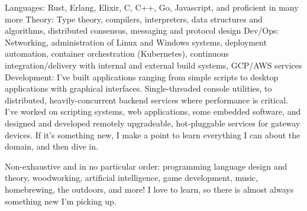 \documentclass[10pt,a4paper]{article}
\begin{document}
\inlineheadsection  %
  {Languages:}
  {Rust, Erlang, Elixir, C, C++, Go, Javascript, and proficient in many more}
\inlineheadsection
  {Theory:}
  {Type theory, compilers, interpreters, data structures and algorithms, distributed consensus, messaging and protocol design}
\inlineheadsection
  {Dev/Ops:}
  {Networking, administration of Linux and Windows systems, deployment automation, container orchestration (Kubernetes), continuous integration/delivery with internal and external build systems, GCP/AWS services}
\inlineheadsection
  {Development:}
  {I've built applications ranging from simple scripts to desktop applications with graphical interfaces. Single-threaded console utilities, to distributed, heavily-concurrent backend services where performance is critical. I've worked on scripting systems, web applications, some embedded software, and designed and developed remotely upgradeable, hot-pluggable services for gateway devices. If it's something new, I make a point to learn everything I can about the domain, and then dive in.}


\inlineheadsection
  {Non-exhaustive and in no particular order:}
  {programming language design and theory, woodworking, artificial intelligence, game development, music, homebrewing, the outdoors, and more! I love to learn, so there is almost always something new I'm picking up.}
\end{document}
